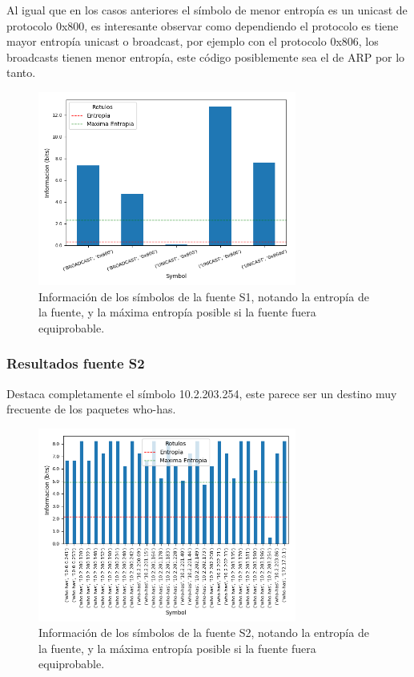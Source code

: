 Al igual que en los casos anteriores el símbolo de menor entropía es un unicast de protocolo 0x800, es interesante observar como dependiendo el protocolo es tiene mayor entropía unicast o broadcast, por ejemplo con el protocolo 0x806, los broadcasts tienen menor entropía, este código posiblemente sea el de ARP por lo tanto.

\begin{figure}[H]
 \centering
 \includegraphics[width=8.5cm]{figs/information_labo6_2018_04_18_S1_output.png}
 \caption{\normalfont Información de los símbolos de la fuente S1, notando la entropía de la fuente, y la máxima entropía posible si la fuente fuera equiprobable.}
\end{figure}

\subsubsection*{Resultados fuente S2}

Destaca completamente el símbolo 10.2.203.254, este parece ser un destino muy frecuente de los paquetes who-has.

\begin{figure}[H]
 \centering
 \includegraphics[width=8.5cm]{figs/information_labo6_2018_04_18_S2_output.png}
 \caption{\normalfont Información de los símbolos de la fuente S2, notando la entropía de la fuente, y la máxima entropía posible si la fuente fuera equiprobable.}
\end{figure}

